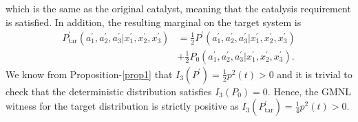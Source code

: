 \documentclass[pra,aps,reprint,superscriptaddress]{revtex4-2}
\theoremstyle{theorem}
\begin{document}
which is the same as the original catalyst, meaning that the catalysis requirement is satisfied. In addition, the resulting marginal on the target system is
\begin{align}\nonumber
    P^{\prime }_{\mathrm{tar}}(a^{\prime}_1,a^{\prime}_2,a^{\prime}_3|x^{\prime}_1,x^{\prime}_2,x^{\prime}_3)&=\frac{1}{2}P^{\prime}(a^{\prime}_1,a^{\prime}_2,a^{\prime}_3|x^{\prime}_1,x^{\prime}_2,x^{\prime}_3)\\&+\frac{1}{2}P_0(a^{\prime}_1,a^{\prime}_2,a^{\prime}_3|x^{\prime}_1,x^{\prime}_2,x^{\prime}_3).
\end{align}
We know from Proposition-\ref{prop1} that $I_3(P^\prime)=\frac{1}{2}p^2(t)>0$ and it is trivial to check that the deterministic distribution satisfies $I_3(P_0) = 0$. Hence, the GMNL witness for the target distribution is strictly positive as $I_3(P^{\prime}_{\mathrm{tar}})=\frac{1}{4}p^2(t)>0$. 
\end{document}
